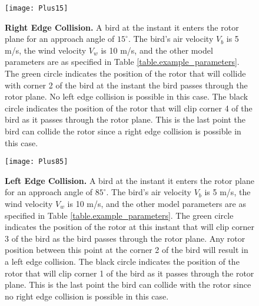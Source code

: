 \label{} \documentclass[10pt,conference]{IEEEtran}
\begin{document}
\begin{figure}
   \centering
   \texttt{[image: Plus15]}
   \caption{\textbf{Right Edge Collision.} A bird at the instant it enters the rotor plane for an approach angle of $15^\circ$. The bird's air velocity $V_b$ is 5
m/s, the wind velocity $V_w$ is 10 m/s, and the other model parameters are as specified in Table
\ref{table.example_parameters}. The green circle indicates the position of the rotor that will collide with corner 2 of
the bird at the instant the bird passes through the rotor plane. No left edge collision is possible in this case. The
black circle indicates the position of the rotor that will clip corner 4 of the bird as it passes through the rotor
plane. This is the last point the bird can collide the rotor since a right edge collision is possible in this case.}
   \label{fig.Plus15}
   \end{figure}


\begin{figure}
   \centering
   \texttt{[image: Plus85]}
   \caption{\textbf{Left Edge Collision.} A bird at the instant it enters the rotor plane for an approach angle of $85^\circ$. The bird's air velocity $V_b$ is 5
m/s, the wind velocity $V_w$ is 10 m/s, and the other model parameters are as specified in Table
\ref{table.example_parameters}. The green circle indicates the position of the rotor at this instant that will clip
corner 3 of the bird as the bird passes through the rotor plane. Any rotor position between this point at the corner 2
of the bird will result in a left edge collision. The black circle indicates the position of the rotor that will clip
corner 1 of the bird as it passes through the rotor plane. This is the last point the bird can collide with the rotor
since no right edge collision is possible in this case.}
   \label{fig.Plus85}
   \end{figure}
\end{document}
